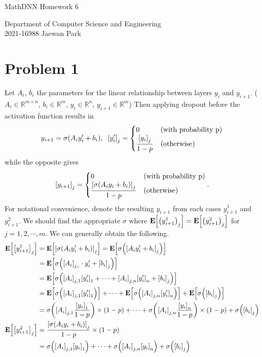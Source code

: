 \documentclass[10pt]{article}
\begin{document}
\begin{center}
    {\LARGE MathDNN Homework 6} \\
\end{center}
\begin{flushright}
    Department of Computer Science and Engineering \\
    2021-16988 Jaewan Park
\end{flushright}

\section*{Problem 1}
Let $A_i$, $b_i$ the parameters for the linear relationship between layers $y_i$ and $y_{i+1}$. ($A_i \in \mathbb{R}^{m \times n}$, $b_i \in \mathbb{R}^{m}$, $y_i \in \mathbb{R}^{n}$, $y_{i+1} \in \mathbb{R}^{m}$)
Then applying dropout before the activation function results in 
$$y_{i+1} = \sigma\qty(A_iy_i' + b_i), \;\; \qty[y_i']_j = \begin{cases}
    0 & \text{(with probability p)} \\ \dfrac{\qty[y_i]_j}{1-p} & \text{(otherwise)}
\end{cases}$$
while the opposite gives
$$\qty[y_{i+1}]_j = \begin{cases}
    0 & \text{(with probability p)} \\ \dfrac{\qty[\sigma\qty(A_iy_i + b_i)]_j}{1-p} & \text{(otherwise)}
\end{cases}.$$
For notational convenience, denote the resulting $y_{i+1}$ from each cases $y_{i+1}^1$ and $y_{i+1}^2$. 
We should find the appropriate $\sigma$ where $\mathbf{E}\qty[\qty(y_{i+1}^1)_j] = \mathbf{E}\qty[\qty(y_{i+1}^2)_j]$ for $j = 1, 2, \cdots, m$. 
We can generally obtain the following.
\begin{align*}
    \mathbf{E}\qty[\qty[y_{i+1}^1]_j] &= \mathbf{E}\qty[\qty[\sigma\qty(A_iy_i' + b_i)]_j] = \mathbf{E}\qty[\sigma\qty(\qty[A_iy_i' + b_i]_j)] \\
    &= \mathbf{E}\qty[\sigma\qty(\qty[A_i]_{j,:}\cdot y_i' + \qty[b_i]_j)] \\
    &= \mathbf{E}\qty[\sigma\qty(\qty[A_i]_{j,1}\qty[y_i']_1 + \cdots + \qty[A_i]_{j,n}\qty[y_i']_n + \qty[b_i]_j)] \\
    &= \mathbf{E}\qty[\sigma\qty(\qty[A_i]_{j,1}\qty[y_i']_1)] + \cdots + \mathbf{E}\qty[\sigma\qty(\qty[A_i]_{j,n}\qty[y_i']_n)] + \mathbf{E}\qty[\sigma\qty(\qty[b_i]_j)] \\
    &= \sigma\qty(\qty[A_i]_{j,1}\frac{\qty[y_i]_1}{1-p}) \times (1-p) + \cdots + \sigma\qty(\qty[A_i]_{j,n}\frac{\qty[y_i]_n}{1-p}) \times (1-p) + \sigma\qty(\qty[b_i]_j) \\
    \mathbf{E}\qty[\qty[y_{i+1}^2]_j] &= \frac{\qty[\sigma\qty(A_iy_i + b_i)]_j}{1-p} \times (1-p) \\
    &= \sigma\qty(\qty[A_i]_{j,1}\qty[y_i]_1) + \cdots + \sigma\qty(\qty[A_i]_{j,n}\qty[y_i]_n) + \sigma\qty(\qty[b_i]_j)
\end{align*}
\end{document}
